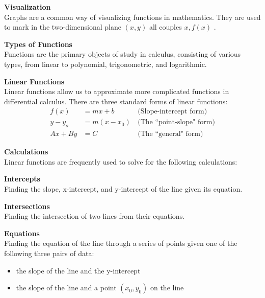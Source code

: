 \documentclass{amsart}
\begin{document}
\begin{outline}
\begin{outline}
\begin{outline}
         \item {\bf Visualization } \\
          Graphs are a common way of visualizing functions in mathematics. They are used to mark in the two-dimensional plane $(x,y)$ all couples $x, f(x)$ \cite{mathfeld}.
      \end{outline}
    \end{outline}
  \item {\bf Types of Functions } \\
    Functions are the primary objects of study in calculus, consisting of various types, from linear to polynomial, trigonometric, and logarithmic. \cite{oregonstate}
  \begin{outline}
    \item {\bf Linear Functions } \\
      Linear functions allow us to approximate more complicated functions in differential calculus. There are three standard forms of linear functions:
      \begin{align*}
        f(x) &= mx + b &\,\text{(Slope-intercept form)} \\
        y - y_o &= m(x - x_0) &\, \text{(The ``point-slope" form)} \\
        Ax + By &= C &\, \text{(The ``general" form)}
      \end{align*}
    \begin{outline}
      \item {\bf Calculations } \\
        Linear functions are frequently used to solve for the following calculations:
      \begin{outline}
        \item {\bf Intercepts } \\
           Finding the slope, x-intercept, and y-intercept of the line given its equation.
        \item {\bf Intersections } \\
          Finding the intersection of two lines from their equations.
        \item {\bf Equations } \\
           Finding the equation of the line through a series of points given one of the following three pairs of data:
           \begin{itemize}
            \item the slope of the line and the y-intercept
            \item the slope of the line and a point $(x_0,y_0)$ on the line

\end{itemize}
\end{outline}
\end{outline}
\end{outline}
\end{outline}
\end{document}
